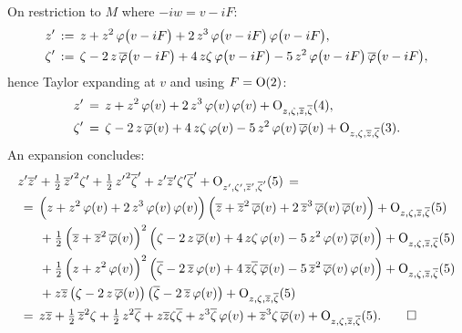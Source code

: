 \documentclass[12pt,twoside,leqno,openany]{amsart}
\begin{document}
\proof
On restriction to $M$ where $-iw = v - iF$:
\[
\aligned
z'
&
\,:=\,
z
+
z^2\,\varphi\big(v-iF\big)
+
2\,z^3\,\varphi\big(v-iF\big)\,\varphi\big(v-iF\big),
\\
\zeta'
&
\,:=\,
\zeta
-
2\,z\,\overline{\varphi}\big(v-iF\big)
+
4\,z\zeta\,
\varphi\big(v-iF\big)
-
5\,z^2\,\varphi\big(v-iF\big)\,
\overline{\varphi}\big(v-iF\big),
\endaligned
\]
hence Taylor expanding at $v$ and using $F = {\rm O}(2)$:
\[
\aligned
z'
&
\,=\,
z
+
z^2\,\varphi(v)
+
2\,z^3\,\varphi(v)\,\varphi(v)
+
{\rm O}_{z,\zeta,\overline{z},\overline{\zeta}}(4),
\\
\zeta'
&
\,=\,
\zeta
-
2\,z\,\overline{\varphi}(v)
+
4\,z\zeta\,\varphi(v)
-
5\,z^2\,\varphi(v)\,\overline{\varphi}(v)
+
{\rm O}_{z,\zeta,\overline{z},\overline{\zeta}}(3).
\endaligned
\]
An expansion concludes:
\begin{align*}
{}
&
z'\overline{z}'
+
\tfrac{1}{2}\,{\overline{z}'}^2\zeta'
+
\tfrac{1}{2}\,{z'}^2\overline{\zeta}'
+
z'\overline{z}'\zeta'\overline{\zeta}'
+
{\rm O}_{z',\zeta',\overline{z}',\overline{\zeta}'}(5)
\,=\,
\notag
\\
&
\,=\,
\Big(
z
+
z^2\,\varphi(v)
+
2\,z^3\,\varphi(v)\,\varphi(v)
\Big)\,
\Big(
\overline{z}
+
\overline{z}^2\,\overline{\varphi}(v)
+
2\,\overline{z}^3\,\overline{\varphi}(v)\,\overline{\varphi}(v)
\Big)
+
{\rm O}_{z,\zeta,\overline{z},\overline{\zeta}}(5)
\notag
\\
&
\ \ \ \ \
+
\tfrac{1}{2}\,
\Big(
\overline{z}
+
\overline{z}^2\,\overline{\varphi}(v)
\Big)^2\,
\Big(
\zeta
-
2\,z\,\overline{\varphi}(v)
+
4\,z\zeta\,\varphi(v)
-
5\,z^2\,\varphi(v)\,\overline{\varphi}(v)
\Big)
+
{\rm O}_{z,\zeta,\overline{z},\overline{\zeta}}(5)
\notag
\\
&
\ \ \ \ \
+
\tfrac{1}{2}\,
\Big(
z
+
z^2\,\varphi(v)
\Big)^2\,
\Big(
\overline{\zeta}
-
2\,\overline{z}\,\varphi(v)
+
4\,\overline{z}\overline{\zeta}\,\overline{\varphi}(v)
-
5\,\overline{z}^2\,\overline{\varphi}(v)\,\varphi(v)
\Big)
+
{\rm O}_{z,\zeta,\overline{z},\overline{\zeta}}(5)
\notag
\\
&
\ \ \ \ \
+
z\overline{z}\,
\big(
\zeta
-
2\,z\,\overline{\varphi}(v)
\big)\,
\big(
\overline{\zeta}
-
2\,\overline{z}\,\varphi(v)
\big)
+
{\rm O}_{z,\zeta,\overline{z},\overline{\zeta}}(5)
\\
&
\,=\,
z\overline{z}
+
\tfrac{1}{2}\,\overline{z}^2\zeta
+
\tfrac{1}{2}\,z^2\overline{\zeta}
+
z\overline{z}\zeta\overline{\zeta}
+
z^3\overline{\zeta}\,\varphi(v)
+
\overline{z}^3\zeta\,\overline{\varphi}(v)
+
{\rm O}_{z,\zeta,\overline{z},\overline{\zeta}}(5).
\qedhere
\end{align*}
\endproof
\end{document}
